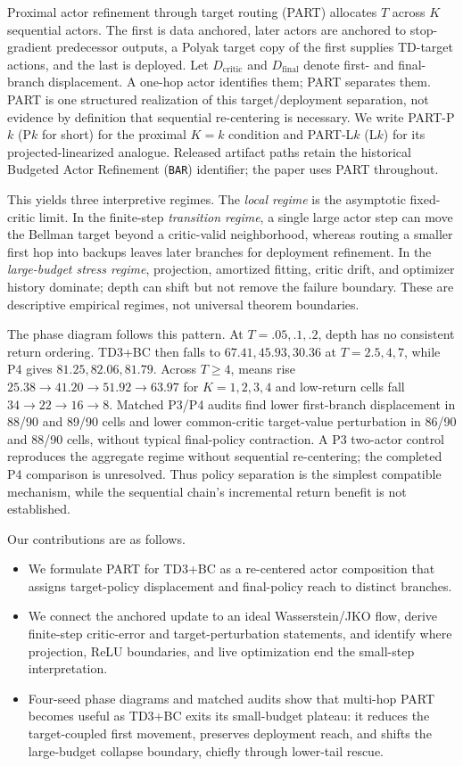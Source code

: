 \documentclass[twoside]{article}
\begin{document}
Proximal actor refinement through target routing (PART) allocates $T$ across $K$ sequential actors. The first is data anchored, later actors are anchored to stop-gradient predecessor outputs, a Polyak target copy of the first supplies TD-target actions, and the last is deployed. Let $D_{\mathrm{critic}}$ and $D_{\mathrm{final}}$ denote first- and final-branch displacement. A one-hop actor identifies them; PART separates them. PART is one structured realization of this target/deployment separation, not evidence by definition that sequential re-centering is necessary. We write PART-P$k$ (P$k$ for short) for the proximal $K=k$ condition and PART-L$k$ (L$k$) for its projected-linearized analogue. Released artifact paths retain the historical Budgeted Actor Refinement (\texttt{BAR}) identifier; the paper uses PART throughout.

This yields three interpretive regimes. The \emph{local regime} is the asymptotic fixed-critic limit. In the finite-step \emph{transition regime}, a single large actor step can move the Bellman target beyond a critic-valid neighborhood, whereas routing a smaller first hop into backups leaves later branches for deployment refinement. In the \emph{large-budget stress regime}, projection, amortized fitting, critic drift, and optimizer history dominate; depth can shift but not remove the failure boundary. These are descriptive empirical regimes, not universal theorem boundaries.

The phase diagram follows this pattern. At $T=.05,.1,.2$, depth has no consistent return ordering. TD3+BC then falls to $67.41,45.93,30.36$ at $T=2.5,4,7$, while P4 gives $81.25,82.06,81.79$. Across $T\ge4$, means rise $25.38\to41.20\to51.92\to63.97$ for $K=1,2,3,4$ and low-return cells fall $34\to22\to16\to8$. Matched P3/P4 audits find lower first-branch displacement in 88/90 and 89/90 cells and lower common-critic target-value perturbation in 86/90 and 88/90 cells, without typical final-policy contraction. A P3 two-actor control reproduces the aggregate regime without sequential re-centering; the completed P4 comparison is unresolved. Thus policy separation is the simplest compatible mechanism, while the sequential chain's incremental return benefit is not established.

Our contributions are as follows.
\begin{itemize}
    \item We formulate PART for TD3+BC as a re-centered actor composition that assigns target-policy displacement and final-policy reach to distinct branches.
    \item We connect the anchored update to an ideal Wasserstein/JKO flow,
    derive finite-step critic-error and target-perturbation statements, and
    identify where projection, ReLU boundaries, and live optimization end the
    small-step interpretation.
    \item Four-seed phase diagrams and matched audits show that multi-hop PART
    becomes useful as TD3+BC exits its small-budget plateau: it reduces the
    target-coupled first movement, preserves deployment reach, and shifts the
    large-budget collapse boundary, chiefly through lower-tail rescue.
\end{itemize}
\end{document}

